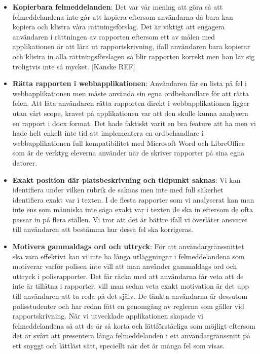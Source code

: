 \documentclass[swedish]{maucsthesis}
\begin{document}
\begin{itemize}
\item \textbf{Kopierbara felmeddelanden}: Det var vår mening att göra så att
  felmeddelandena inte går att kopiera eftersom användarna då bara kan kopiera
  och klistra våra rättningsförslag. Det är viktigt att engagera användaren i
  rättningen av rapporten eftersom ett av målen med applikationen är att lära ut
  rapportskrivning, ifall användaren bara kopierar och klistra in alla
  rättningsförslagen så blir rapporten korrekt men han lär sig troligtvis inte
  så mycket. [Kanske REF]
\item \textbf{Rätta rapporten i webbapplikationen}: Användaren får en lista på
  fel i webbapplikationen men måste använda sin egna ordbehandlare för att rätta
  felen. Att låta användaren rätta rapporten direkt i webbapplikationen ligger
  utan vårt scope, kravet på applikationen var att den skulle kunna analysera en
  rapport i docx format. Det hade faktiskt varit en bra feature att ha men vi
  hade helt enkelt inte tid att implementera en ordbehandlare i
  webbapplikationen full kompatibilitet med Microsoft Word och LibreOffice som
  är de verktyg eleverna använder när de skriver rapporter på sina egna datorer.
\item \textbf{Exakt position där platsbeskrivning och tidpunkt saknas}: Vi kan
  identifiera under vilken rubrik de saknas men inte med full säkerhet
  identifiera exakt var i texten. I de flesta rapporter som vi analyserat kan
  man inte ens som människa inte säga exakt var i texten de ska in eftersom de
  ofta passar in på flera ställen. Vi tror att det är bättre ifall vi överlåter
  ansvaret till användaren att bestämma hur dessa fel ska korrigeras.
\item \textbf{Motivera gammaldags ord och uttryck}: För att användargränssnittet
  ska vara effektivt kan vi inte ha långa utläggningar i felmeddelandena som
  motiverar varför polisen inte vill att man använder gammaldags ord och uttryck
  i polisrapporter. Det får räcka med att användarna får veta att de inte är
  tillåtna i rapporter, vill man sedan veta exakt motivation är det upp till
  användaren att ta reda på det själv. De tänkta användarna är dessutom
  polisstudenter och har redan fått en genomgång av reglerna som gäller vid
  rapportskrivning. När vi utvecklade applikationen skapade vi felmeddelandena
  så att de är så korta och lättförståeliga som möjligt eftersom det är svårt
  att presentera långa felmeddelanden i ett användargränssnitt på ett snyggt och
  lättläst sätt, speciellt när det är många fel som visas.
\end{itemize}
\end{document}
